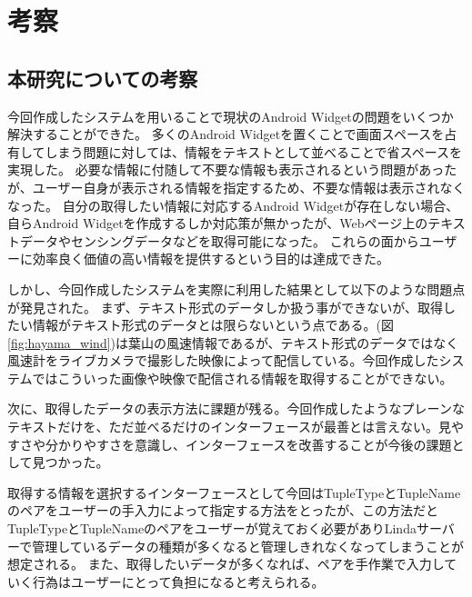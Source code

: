 \chapter{考察}
\label{chap:consideration}

\section{本研究についての考察}
今回作成したシステムを用いることで現状のAndroid Widgetの問題をいくつか解決することができた。
多くのAndroid Widgetを置くことで画面スペースを占有してしまう問題に対しては、情報をテキストとして並べることで省スペースを実現した。
必要な情報に付随して不要な情報も表示されるという問題があったが、ユーザー自身が表示される情報を指定するため、不要な情報は表示されなくなった。
自分の取得したい情報に対応するAndroid Widgetが存在しない場合、自らAndroid Widgetを作成するしか対応策が無かったが、Webページ上のテキストデータやセンシングデータなどを取得可能になった。
これらの面からユーザーに効率良く価値の高い情報を提供するという目的は達成できた。

しかし、今回作成したシステムを実際に利用した結果として以下のような問題点が発見された。
まず、テキスト形式のデータしか扱う事ができないが、取得したい情報がテキスト形式のデータとは限らないという点である。(図\ref{fig:hayama_wind})は葉山の風速情報であるが、テキスト形式のデータではなく風速計をライブカメラで撮影した映像によって配信している。今回作成したシステムではこういった画像や映像で配信される情報を取得することができない。

次に、取得したデータの表示方法に課題が残る。今回作成したようなプレーンなテキストだけを、ただ並べるだけのインターフェースが最善とは言えない。見やすさや分かりやすさを意識し、インターフェースを改善することが今後の課題として見つかった。

取得する情報を選択するインターフェースとして今回はTupleTypeとTupleNameのペアをユーザーの手入力によって指定する方法をとったが、この方法だとTupleTypeとTupleNameのペアをユーザーが覚えておく必要がありLindaサーバーで管理しているデータの種類が多くなると管理しきれなくなってしまうことが想定される。
また、取得したいデータが多くなれば、ペアを手作業で入力していく行為はユーザーにとって負担になると考えられる。

